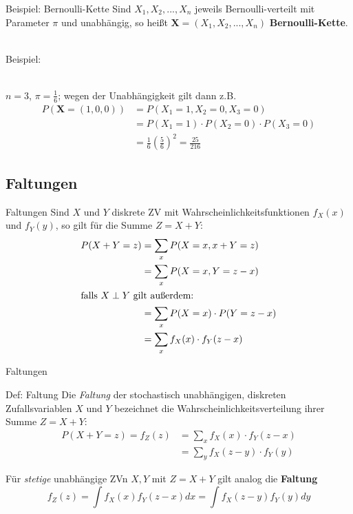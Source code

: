 \documentclass[
  10pt,
  ignorenonframetext,
]{beamer}
\begin{document}
\begin{frame}{Beispiel: Bernoulli-Kette}
\label{beispiel-bernoulli-kette}
Sind \(X_1, X_2, ..., X_n\) jeweils Bernoulli-verteilt mit Parameter
\(\pi\) und unabhängig, so heißt \(\symbf{X}=(X_1, X_2, ..., X_n)\)
\textbf{Bernoulli-Kette}.\\
\strut \\
Beispiel:\\
\strut \\

\(n = 3\), \(\pi = \frac{1}{6}\); wegen der Unabhängigkeit gilt dann
z.B. \begin{align*}
P(\symbf{X} = (1, 0, 0)) &= P(X_1 = 1, X_2 = 0, X_3 = 0) \\
                         &= P(X_1 = 1) \cdot P(X_2 = 0) \cdot P(X_3 = 0)  \\
                         &= \frac{1}{6} \left(\frac{5}{6}\right)^2 = \frac{25}{216}
\end{align*}
\end{frame}

\subsection{Faltungen}\label{faltungen}

\begin{frame}{Faltungen}
\label{faltungen-1}
Sind \(X\) und \(Y\) diskrete ZV mit Wahrscheinlichkeitsfunktionen
\(f_X(x)\) und \(f_Y(y)\), so gilt für die Summe \(Z = X + Y\):
\begin{align*}
P(X + Y = z) & =  \sum_x P(X = x, x + Y = z)\\
& =  \sum_x P(X = x, Y = z - x)\\
\intertext{falls $X \perp Y$ gilt außerdem:}
&=  \sum_x P(X = x) \cdot P(Y = z - x)\\
& =  \sum_x f_X(x) \cdot f_Y(z - x)
\end{align*}
\end{frame}

\begin{frame}{Faltungen}
\label{faltungen-2}
\begin{block}{Def: Faltung}
\label{def-faltung}
Die \emph{Faltung} der stochastisch unabhängigen, diskreten
Zufallsvariablen \(X\) und \(Y\) bezeichnet die
Wahrscheinlichkeitsverteilung ihrer Summe \(Z = X + Y\): \begin{align*}
P(X + Y = z) = f_Z(z) & =  \sum_x f_X(x) \cdot f_Y(z - x) \\
& = \sum_y f_X(z-y) \cdot f_Y(y)
\end{align*}
\end{block}

Für \emph{stetige} unabhängige ZVn \(X, Y\) mit \(Z = X + Y\) gilt
analog die \textbf{Faltung}
\[f_Z(z) = \int f_X(x) f_Y(z-x) dx = \int f_X(z-y) f_Y(y) dy\]
\end{frame}
\end{document}
